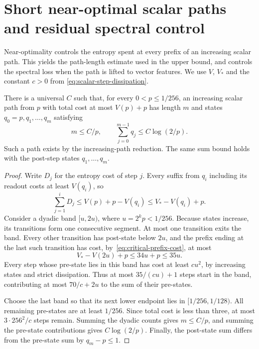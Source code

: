 \section{Short near-optimal scalar paths and residual spectral control}
\label{sec:critical-short-path-control}

Near-optimality controls the entropy spent at every prefix of an
increasing scalar path. This yields the path-length estimate used in
the upper bound, and controls the spectral loss when the path is lifted
to vector features. We use $V$, $V_*$ and the constant $c>0$ from
\eqref{eq:scalar-step-dissipation}.

\begin{lemma}
\label{lem:critical-dyadic-short-path}
There is a universal $C$ such that, for every $0<p\le1/256$, an
increasing scalar path from $p$ with total cost at most $V(p)+p$ has
length $m$ and states $q_0=p,q_1,\ldots,q_m$ satisfying
\[
 m\le C/p,\qquad
 \sum_{j=0}^{m-1}q_j\le C\log(2/p).
\]
Such a path exists by the increasing-path reduction. The same sum bound
holds with the post-step states $q_1,\ldots,q_m$.
\end{lemma}

\begin{proof}
Write $D_j$ for the entropy cost of step $j$. Every suffix from $q_i$
including its readout costs at least $V(q_i)$, so
\begin{equation}\label{eq:critical-prefix-cost}
 \sum_{j=1}^{i}D_j
 \le V(p)+p-V(q_i)\le V_*-V(q_i)+p.
\end{equation}
Consider a dyadic band $[u,2u)$, where $u=2^kp<1/256$.
Because states increase, its transitions form one consecutive segment.
At most one transition exits the band. Every other transition has
post-state below $2u$, and the prefix ending at the last such transition
has cost, by~\eqref{eq:critical-prefix-cost}, at most
\[
 V_*-V(2u)+p\le34u+p\le35u.
\]
Every step whose pre-state lies in this band has cost at least $cu^2$,
by increasing states and strict dissipation. Thus at most
$35/(cu)+1$ steps start in the band, contributing at most $70/c+2u$
to the sum of their pre-states.

Choose the last band so that its next lower endpoint lies in
$[1/256,1/128)$. All remaining pre-states are at least $1/256$.
Since total cost is less than three, at most $3\cdot256^2/c$
steps remain. Summing the dyadic counts gives $m\le C/p$, and summing
the pre-state contributions gives $C\log(2/p)$.
Finally, the post-state sum differs from the pre-state sum by
$q_m-p\le1$.
\end{proof}

